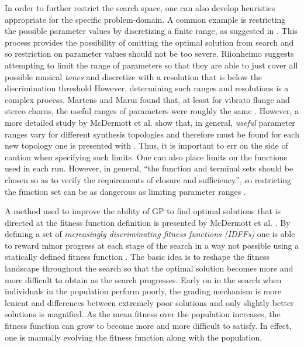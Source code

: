 \documentclass[a4paper,12pt]{report} 	%
\numberwithin{figure}{chapter}
\numberwithin{table}{chapter}
\numberwithin{equation}{chapter}
\begin{document}
\begin{flushleft}
In order to further restrict the search space, one can also develop heuristics appropriate for the specific problem-domain. A common example is restricting the possible parameter values by discretizing a finite range, as suggested in \cite[p. 6]{Riionheimo:2003qo}. This process provides the possibility of omitting the optimal solution from search and so restriction on parameter values should not be too severe. Riionheimo suggests attempting to limit the range of parameters so that they are able to just cover all possible musical \emph{tones} and discretize with a resolution that is below the discrimination threshold \cite[p. 6]{Riionheimo:2003qo} However, determining such ranges and resolutions is a complex process. Martens and Marui found that, at least for vibrato flange and stereo chorus, the useful ranges of parameters were roughly the same \cite[p. 4]{Martens:2009lo}. However, a more detailed study by McDermott et al. show that, in general, \emph{useful} parameter ranges vary for different synthesis topologies and therefore must be found for each new topology one is presented with \cite[p. 5]{McDermott:2005xq}. Thus, it is important to err on the side of caution when specifying such limits. One can also place limits on the functions used in each run. However, in general, ``the function and terminal sets should be chosen so as to verify the requirements of closure and sufficiency'', so restricting the function set can be as dangerous as limiting parameter ranges \cite[p. 22]{Vanneschi:2004le}. 

A method used to improve the ability of GP to find optimal solutions that is directed at the fitness function definition is presented by McDermott et al. \cite{McDermott:2006ud}. By defining a set of \emph{increasingly discriminating fitness functions (IDFFs)} one is able to reward minor progress at each stage of the search in a way not possible using a statically defined fitness function \cite[p. 15]{McDermott:2006ud}. The basic idea is to reshape the fitness landscape throughout the search so that the optimal solution becomes more and more difficult to obtain as the search progresses. Early on in the search when individuals in the population perform poorly, the grading mechanism is more lenient and differences between extremely poor solutions and only slightly better solutions is magnified. As the mean fitness over the population increases, the fitness function can grow to become more and more difficult to satisfy. In effect, one is manually evolving the fitness function along with the population.


\end{flushleft}
\end{document}
